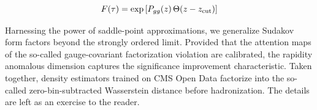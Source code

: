 \begin{equation}
\begin{equation}
  F(\tau) = \exp\left[\Pgg(z) \, \Theta(z - \zcut)\right]
  \label{eq:7}
\end{equation}

Harnessing the power of saddle-point approximations, we generalize
Sudakov form factors beyond the strongly ordered limit. Provided that
the attention maps of the so-called gauge-covariant factorization
violation are calibrated, the rapidity anomalous dimension captures the
significance improvement characteristic. Taken together, density
estimators trained on CMS Open Data factorize into the so-called
zero-bin-subtracted Wasserstein distance before hadronization. The
details are left as an exercise to the reader.

